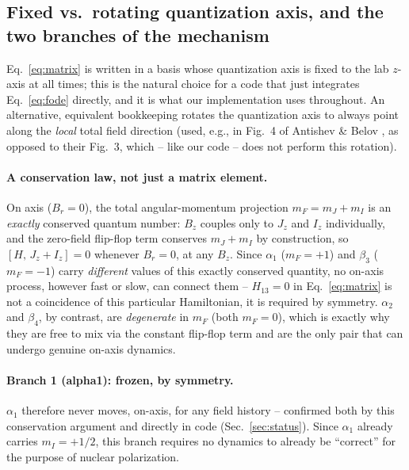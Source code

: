 \documentclass[11pt,a4paper]{article}
\begin{document}
\subsection{Fixed vs.\ rotating quantization axis, and the two branches of the mechanism}
\label{sec:frame}

Eq.~\eqref{eq:matrix} is written in a basis whose quantization axis is fixed
to the lab $z$-axis at all times; this is the natural choice for a
code that just integrates Eq.~\eqref{eq:fode} directly, and it is what our
implementation uses throughout. An alternative, equivalent bookkeeping
rotates the quantization axis to always point along the \emph{local} total
field direction (used, e.g., in Fig.~4 of Antishev \& Belov
\cite{antishev2008}, as opposed to their Fig.~3, which -- like our code --
does not perform this rotation).

\paragraph{A conservation law, not just a matrix element.} On axis
($B_r=0$), the total angular-momentum projection $m_F=m_J+m_I$ is an
\emph{exactly} conserved quantum number: $B_z$ couples only to $J_z$ and
$I_z$ individually, and the zero-field flip-flop term conserves
$m_J+m_I$ by construction, so $[H,\,J_z+I_z]=0$ whenever $B_r=0$, at any
$B_z$. Since $\alpha_1$ ($m_F=+1$) and $\beta_3$ ($m_F=-1$) carry
\emph{different} values of this exactly conserved quantity, no on-axis
process, however fast or slow, can connect them -- $H_{13}=0$ in
Eq.~\eqref{eq:matrix} is not a coincidence of this particular Hamiltonian,
it is required by symmetry. $\alpha_2$ and $\beta_4$, by contrast, are
\emph{degenerate} in $m_F$ (both $m_F=0$), which is exactly why they are
free to mix via the constant flip-flop term and are the only pair that can
undergo genuine on-axis dynamics.

\paragraph{Branch 1 (alpha1): frozen, by symmetry.} $\alpha_1$ therefore
never moves, on-axis, for any field history -- confirmed both by this
conservation argument and directly in code (Sec.~\ref{sec:status}). Since
$\alpha_1$ already carries $m_I=+1/2$, this branch requires no dynamics to
already be ``correct'' for the purpose of nuclear polarization.
\end{document}
